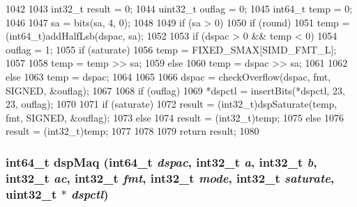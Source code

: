 \begin{DoxyCode}
1042 {
1043     int32_t result = 0;
1044     uint32_t ouflag = 0;
1045     int64_t temp = 0;
1046 
1047     sa = bits(sa, 4, 0);
1048 
1049     if (sa > 0) {
1050         if (round) {
1051             temp = (int64_t)addHalfLsb(dspac, sa);
1052 
1053             if (dspac > 0 && temp < 0) {
1054                 ouflag = 1;
1055                 if (saturate)
1056                     temp = FIXED_SMAX[SIMD_FMT_L];
1057             }
1058             temp = temp >> sa;
1059         } else {
1060             temp = dspac >> sa;
1061         }
1062     } else {
1063         temp = dspac;
1064     }
1065 
1066     dspac = checkOverflow(dspac, fmt, SIGNED, &ouflag);
1067 
1068     if (ouflag) {
1069         *dspctl = insertBits(*dspctl, 23, 23, ouflag);
1070 
1071         if (saturate)
1072             result = (int32_t)dspSaturate(temp, fmt, SIGNED, &ouflag);
1073         else
1074             result = (int32_t)temp;
1075     } else {
1076         result = (int32_t)temp;
1077     }
1078 
1079     return result;
1080 }
\end{DoxyCode}
\hypertarget{namespaceMipsISA_a6279e65f0daf37eafa4bbd108beb11a6}{
\subsubsection[{dspMaq}]{\setlength{\rightskip}{0pt plus 5cm}int64\_\-t dspMaq (int64\_\-t {\em dspac}, \/  int32\_\-t {\em a}, \/  int32\_\-t {\em b}, \/  int32\_\-t {\em ac}, \/  int32\_\-t {\em fmt}, \/  int32\_\-t {\em mode}, \/  int32\_\-t {\em saturate}, \/  {\bf uint32\_\-t} $\ast$ {\em dspctl})}}
\label{namespaceMipsISA_a6279e65f0daf37eafa4bbd108beb11a6}



